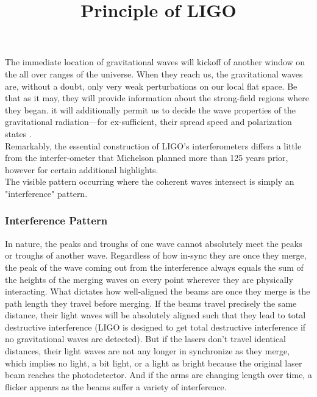 \title{Principle of LIGO}

\maketitle

The immediate location of gravitational waves will  kickoff of another window on the all over ranges of the universe. When they reach us, the gravitational waves are,  without a doubt, only very weak perturbations on our local flat space. Be that as it may, they will provide information about the strong-field regions where they began. it will additionally permit us to decide the wave properties of the gravitational radiation—for ex-sufficient, their spread speed and polarization states \cite{barish1999ligo}.\\

Remarkably, the essential construction of LIGO's interferometers differs a little from the interfer-ometer that Michelson planned more than 125 years prior, however for certain additional highlights\cite{collaboration2015advanced}.\\
The visible pattern occurring where the coherent waves intersect is simply an "interference" pattern.\\
\subsubsection{Interference Pattern}
In  nature,  the  peaks  and  troughs  of  one  wave cannot absolutely  meet  the  peaks or  troughs  of  another  wave. Regardless  of  how in-sync they are once they merge, the peak of the wave coming out from the interference always equals the sum of the heights of the merging waves on every point wherever they are physically interacting. What  dictates how  well-aligned  the  beams are once  they  merge  is  the path length  they travel before merging.  If the beams travel precisely the same distance, their light waves will be absolutely aligned such that they lead to total destructive interference (LIGO is designed to get total destructive interference if no gravitational waves are detected).  But if the lasers don’t travel identical distances, their light waves are not any longer in synchronize as they merge, which implies no light, a bit light, or a light as bright because the original laser beam reaches the photodetector.  And if the arms are changing length over time, a flicker appears as the beams suffer a variety of interference.\\

